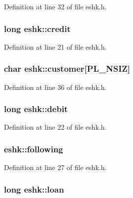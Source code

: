 Definition at line 32 of file eshk.\+h.

\hypertarget{structeshk_a673827b266a4208b0c1c4f7155481614}{
\subsubsection[{credit}]{\setlength{\rightskip}{0pt plus 5cm}long eshk\+::credit}}\label{structeshk_a673827b266a4208b0c1c4f7155481614}


Definition at line 21 of file eshk.\+h.

\hypertarget{structeshk_ae7ed241193a9bd4c4256a68a2fc1aa08}{
\subsubsection[{customer}]{\setlength{\rightskip}{0pt plus 5cm}char eshk\+::customer\mbox{[}{\bf P\+L\+\_\+\+N\+S\+I\+Z}\mbox{]}}}\label{structeshk_ae7ed241193a9bd4c4256a68a2fc1aa08}


Definition at line 36 of file eshk.\+h.

\hypertarget{structeshk_a2dc7e7788b1c6300dba3ac1a1b0f684f}{
\subsubsection[{debit}]{\setlength{\rightskip}{0pt plus 5cm}long eshk\+::debit}}\label{structeshk_a2dc7e7788b1c6300dba3ac1a1b0f684f}


Definition at line 22 of file eshk.\+h.

\hypertarget{structeshk_a65a1313473ad52859ffbac243f876b63}{
\subsubsection[{following}]{ eshk\+::following}}\label{structeshk_a65a1313473ad52859ffbac243f876b63}


Definition at line 27 of file eshk.\+h.

\hypertarget{structeshk_a90da51ea1c3c4fa444dd83daea94138b}{
\subsubsection[{loan}]{\setlength{\rightskip}{0pt plus 5cm}long eshk\+::loan}}\label{structeshk_a90da51ea1c3c4fa444dd83daea94138b}


